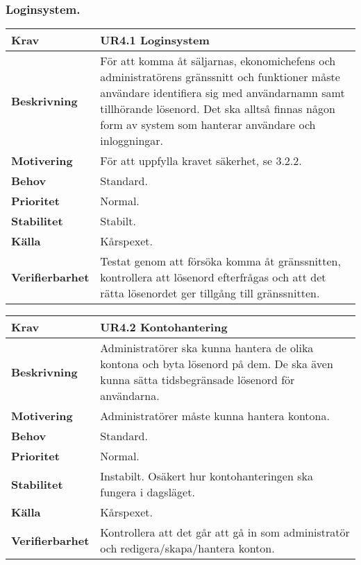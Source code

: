 \documentclass[a4paper, twoside, 11pt, titlepage]{article}
\begin{document}
		\subsubsection{Loginsystem.}


		\begin{tabular} { p{2.6cm} p{12.5cm} }
			\hline
			\sffamily\textbf{Krav} & \sffamily\textbf{UR4.1 Loginsystem  } \\
			\hline
			\sffamily\textbf{Beskrivning} & För att komma åt säljarnas, ekonomichefens och administratörens gränssnitt och funktioner måste användare identifiera sig med användarnamn samt tillhörande lösenord. Det ska alltså finnas någon form av system som hanterar användare och inloggningar.  \\
			\hline
			\sffamily\textbf{Motivering} & För att uppfylla kravet säkerhet, se 3.2.2.  \\
			\hline
			\sffamily\textbf{Behov} & Standard.  \\
			\hline
			\sffamily\textbf{Prioritet} & Normal.  \\
			\hline
			\sffamily\textbf{Stabilitet} & Stabilt.  \\
			\hline
			\sffamily\textbf{Källa} & Kårspexet.  \\
			\hline
			\sffamily\textbf{Verifierbarhet} & Testat genom att försöka komma åt gränssnitten, kontrollera att lösenord efterfrågas och att det rätta lösenordet ger tillgång till gränssnitten.  \\
			\hline
		\end{tabular}
		\vspace{6mm}

		\begin{tabular} { p{2.6cm} p{12.5cm} }
			\hline
			\sffamily\textbf{Krav} & \sffamily\textbf{UR4.2 Kontohantering  } \\
			\hline
			\sffamily\textbf{Beskrivning} & Administratörer ska kunna hantera de olika kontona och byta lösenord på dem. De ska även kunna sätta tidsbegränsade lösenord för användarna.  \\
			\hline
			\sffamily\textbf{Motivering} & Administratörer måste kunna hantera kontona.  \\
			\hline
			\sffamily\textbf{Behov} & Standard.  \\
			\hline
			\sffamily\textbf{Prioritet} & Normal.  \\
			\hline
			\sffamily\textbf{Stabilitet} & Instabilt. Osäkert hur kontohanteringen ska fungera i dagsläget.  \\
			\hline
			\sffamily\textbf{Källa} & Kårspexet.  \\
			\hline
			\sffamily\textbf{Verifierbarhet} & Kontrollera att det går att gå in som administratör och redigera/skapa/hantera konton.  \\
			\hline
		\end{tabular}
		\vspace{6mm}
\end{document}
